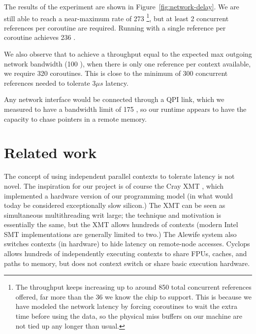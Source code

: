 \documentclass[10pt,nocopyrightspace,preprint]{sigplanconf}
\begin{document}
The results of the experiment are shown in
Figure~\ref{fig:network-delay}. We are still able to reach a
near-maximum rate of 273 \mrps\footnote{The throughput keeps increasing up to around 850 total concurrent references offered, far more than the 36 we know the chip to support. This is because we have modeled the network latency by forcing coroutines to wait the extra time before using the data, so the physical miss buffers on our machine are not tied up any longer than usual.}, but at least 2
concurrent references per coroutine are required. Running with a single
reference per coroutine achieves 236 \mrps. 

We also observe that to achieve a throughput equal to the expected max outgoing network bandwidth (100 \mrps),  when there is only one reference per context available, we require 320 coroutines. This is close to the minimum of 300 concurrent references needed to tolerate $3 \mu s$ latency.

Any network interface would be connected through a QPI link,
which we measured to have a bandwidth limit of 175 \mrps, so our runtime appears to have the capacity to chase pointers
in a remote memory. 



%

\section{Related work}
\label{sec:related}
The concept of using independent parallel contexts to tolerate latency
is not novel.  The inspiration for our project is of course the Cray
XMT \cite{feo-xmt}, which implemented a hardware version of our
programming model (in what would today be considered exceptionally
slow silicon.)  The XMT can be seen as simultaneous multithreading
\cite{tullsen-smt} writ large; the technique and motivation is
essentially the same, but the XMT allows hundreds of contexts (modern
Intel SMT implementations are generally limited to two.) The Alewife
system \cite{agarwal-alewife} also switches contexts (in hardware) to
hide latency on remote-node accesses.  Cyclops \cite{almasi-cyclops}
allows hundreds of independently executing contexts to share FPUs,
caches, and paths to memory, but does not context switch or share
basic execution hardware.  
\end{document}
